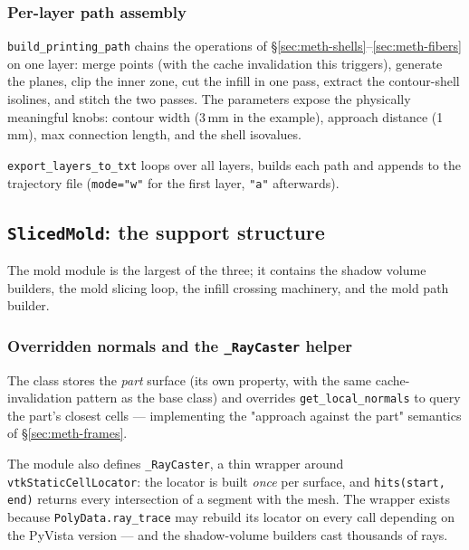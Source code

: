 \subsubsection{Per-layer path assembly}

\texttt{build\_printing\_path} chains the operations of
\S\ref{sec:meth-shells}--\ref{sec:meth-fibers} on one layer: merge
points (with the cache invalidation this triggers), generate the
planes, clip the inner zone, cut the infill in one pass, extract the
contour-shell isolines, and stitch the two passes. The parameters
expose the physically meaningful knobs: contour width (3\,mm in the
example), approach distance (1\,mm), max connection length, and the
shell isovalues.

\texttt{export\_layers\_to\_txt} loops over all layers, builds each
path and appends to the trajectory file
(\texttt{mode="w"} for the first layer, \texttt{"a"} afterwards).

\subsection{\texttt{SlicedMold}: the support structure}\label{sec:impl-mold}

The mold module is the largest of the three; it contains the shadow
volume builders, the mold slicing loop, the infill crossing machinery,
and the mold path builder.

\subsubsection{Overridden normals and the \texttt{\_RayCaster} helper}

The class stores the \emph{part} surface (its own property, with the
same cache-invalidation pattern as the base class) and overrides
\texttt{get\_local\_normals} to query the part's closest cells ---
implementing the "approach against the part" semantics of
\S\ref{sec:meth-frames}.

The module also defines \texttt{\_RayCaster}, a thin wrapper around
\texttt{vtkStaticCellLocator}: the locator is built \emph{once} per
surface, and \texttt{hits(start, end)} returns every intersection of a
segment with the mesh. The wrapper exists because
\texttt{PolyData.ray\_trace} may rebuild its locator on every call
depending on the PyVista version --- and the shadow-volume builders
cast thousands of rays.

